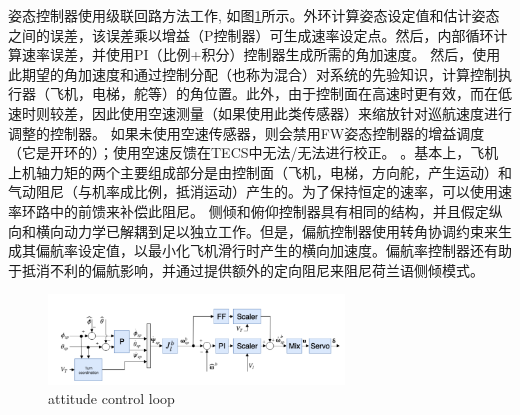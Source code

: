 姿态控制器使用级联回路方法工作, 如图\ref{atti}所示。外环计算姿态设定值和估计姿态之间的误差，该误差乘以增益（P控制器）可生成速率设定点。然后，内部循环计算速率误差，并使用PI（比例+积分）控制器生成所需的角加速度。
然后，使用此期望的角加速度和通过控制分配（也称为混合）对系统的先验知识，计算控制执行器（飞机，电梯，舵等）的角位置。此外，由于控制面在高速时更有效，而在低速时则较差，因此使用空速测量（如果使用此类传感器）来缩放针对巡航速度进行调整的控制器。
如果未使用空速传感器，则会禁用FW姿态控制器的增益调度（它是开环的）；使用空速反馈在TECS中无法/无法进行校正。
。基本上，飞机上机轴力矩的两个主要组成部分是由控制面（飞机，电梯，方向舵，产生运动）和气动阻尼（与机率成比例，抵消运动）产生的。为了保持恒定的速率，可以使用速率环路中的前馈来补偿此阻尼。
侧倾和俯仰控制器具有相同的结构，并且假定纵向和横向动力学已解耦到足以独立工作。但是，偏航控制器使用转角协调约束来生成其偏航率设定值，以最小化飞机滑行时产生的横向加速度。偏航率控制器还有助于抵消不利的偏航影响，并通过提供额外的定向阻尼来阻尼荷兰语侧倾模式。
        \begin{figure}[t]
            \centering
            \includegraphics[width=0.7\textwidth]{pictures/attitude.png}
            \caption{attitude control loop}
            \label{atti}
        \end{figure}